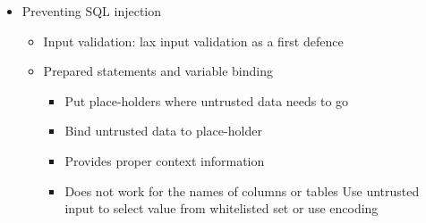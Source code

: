 \documentclass[12pt,titlepage,a4paper]{report}
\begin{document}
\begin{itemize}
				\item Preventing SQL injection
				\begin{itemize}
					\item Input validation: lax input validation as a first defence
					\item Prepared statements and variable binding
					\begin{itemize}
						\item Put place-holders where untrusted data needs to go
						\item Bind untrusted data to place-holder
						\item Provides proper context information
						\item Does not work for the names of columns or tables
							\subitem Use untrusted input to select value from whitelisted set or use encoding
					\end{itemize}
				\end{itemize}
			\end{itemize}
			
\end{document}
